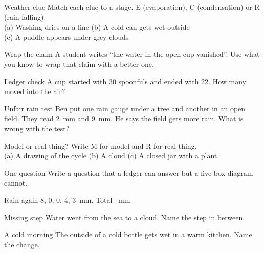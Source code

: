 \begin{puzzle}{Weather clue}
Match each clue to a stage. E (evaporation), C (condensation) or R (rain falling).\\
(a) Washing dries on a line \wline[1cm] \quad (b) A cold can gets wet outside \wline[1cm]\\
(c) A puddle appears under grey clouds \wline[1cm]
\end{puzzle}

\begin{puzzle}{Wrap the claim}
A student writes ``the water in the open cup vanished''. Use what you know to wrap that claim with a better one. \wline[6cm]
\end{puzzle}

\clearpage

\begin{puzzle}{Ledger check}
A cup started with 30 spoonfuls and ended with 22. How many moved into the air? \wline[1.6cm]
\end{puzzle}

\begin{puzzle}{Unfair rain test}
Ben put one rain gauge under a tree and another in an open field. They read 2~mm and 9~mm. He says the field gets more rain. What is wrong with the test? \wline[6cm]
\end{puzzle}

\begin{puzzle}{Model or real thing?}
Write M for model and R for real thing.\\
(a) A drawing of the cycle \wline[1cm] \quad (b) A cloud \wline[1cm] \quad (c) A closed jar with a plant \wline[1cm]
\end{puzzle}

\begin{puzzle}{One question}
Write a question that a ledger can answer but a five-box diagram cannot. \wline[6cm]
\end{puzzle}

\clearpage

\begin{puzzle}{Rain again}
8, 0, 0, 4, 3~mm. Total \wline[1.6cm]~mm
\end{puzzle}

\begin{puzzle}{Missing step}
Water went from the sea to a cloud. Name the step in between. \wline[3cm]
\end{puzzle}

\begin{puzzle}{A cold morning}
The outside of a cold bottle gets wet in a warm kitchen. Name the change. \wline[3cm]
\end{puzzle}

